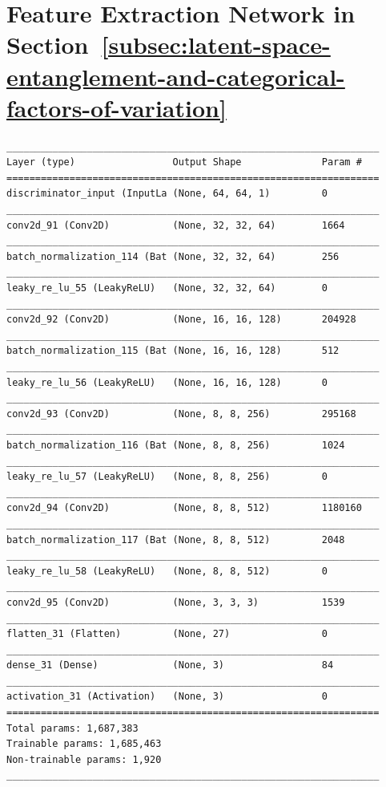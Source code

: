 \documentclass[11pt]{article}
\let\oldsection\section
\renewcommand\section{\clearpage\oldsection}
\begin{document}
\section{Feature Extraction Network in Section~\ref{subsec:latent-space-entanglement-and-categorical-factors-of-variation}}\label{sec:appendix_feature_extraction_network_ppl_dsprites}
\begin{lstlisting}[caption={Feature extraction network for \ac{PPL} computation.},captionpos=b]
_________________________________________________________________
Layer (type)                 Output Shape              Param #
=================================================================
discriminator_input (InputLa (None, 64, 64, 1)         0
_________________________________________________________________
conv2d_91 (Conv2D)           (None, 32, 32, 64)        1664
_________________________________________________________________
batch_normalization_114 (Bat (None, 32, 32, 64)        256
_________________________________________________________________
leaky_re_lu_55 (LeakyReLU)   (None, 32, 32, 64)        0
_________________________________________________________________
conv2d_92 (Conv2D)           (None, 16, 16, 128)       204928
_________________________________________________________________
batch_normalization_115 (Bat (None, 16, 16, 128)       512
_________________________________________________________________
leaky_re_lu_56 (LeakyReLU)   (None, 16, 16, 128)       0
_________________________________________________________________
conv2d_93 (Conv2D)           (None, 8, 8, 256)         295168
_________________________________________________________________
batch_normalization_116 (Bat (None, 8, 8, 256)         1024
_________________________________________________________________
leaky_re_lu_57 (LeakyReLU)   (None, 8, 8, 256)         0
_________________________________________________________________
conv2d_94 (Conv2D)           (None, 8, 8, 512)         1180160
_________________________________________________________________
batch_normalization_117 (Bat (None, 8, 8, 512)         2048
_________________________________________________________________
leaky_re_lu_58 (LeakyReLU)   (None, 8, 8, 512)         0
_________________________________________________________________
conv2d_95 (Conv2D)           (None, 3, 3, 3)           1539
_________________________________________________________________
flatten_31 (Flatten)         (None, 27)                0
_________________________________________________________________
dense_31 (Dense)             (None, 3)                 84
_________________________________________________________________
activation_31 (Activation)   (None, 3)                 0
=================================================================
Total params: 1,687,383
Trainable params: 1,685,463
Non-trainable params: 1,920
_________________________________________________________________
\end{lstlisting}
\end{document}

